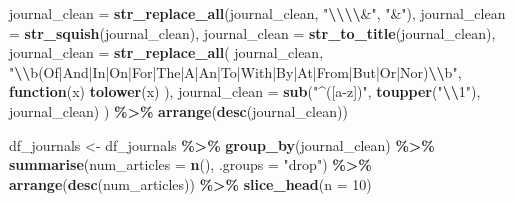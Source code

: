 \documentclass[
]{article}
\newenvironment{Shaded}{\begin{snugshade}}{\end{snugshade}}
\newcommand{\AttributeTok}[1]{\textcolor[rgb]{0.13,0.29,0.53}{#1}}
\newcommand{\ControlFlowTok}[1]{\textcolor[rgb]{0.13,0.29,0.53}{\textbf{#1}}}
\newcommand{\DecValTok}[1]{\textcolor[rgb]{0.00,0.00,0.81}{#1}}
\newcommand{\FunctionTok}[1]{\textcolor[rgb]{0.13,0.29,0.53}{\textbf{#1}}}
\newcommand{\NormalTok}[1]{#1}
\newcommand{\OtherTok}[1]{\textcolor[rgb]{0.56,0.35,0.01}{#1}}
\newcommand{\SpecialCharTok}[1]{\textcolor[rgb]{0.81,0.36,0.00}{\textbf{#1}}}
\newcommand{\StringTok}[1]{\textcolor[rgb]{0.31,0.60,0.02}{#1}}
\begin{document}
\begin{Shaded}
\begin{Highlighting}[]
    \AttributeTok{journal\_clean =} \FunctionTok{str\_replace\_all}\NormalTok{(journal\_clean, }\StringTok{"}\SpecialCharTok{\textbackslash{}\textbackslash{}\textbackslash{}\textbackslash{}}\StringTok{\&"}\NormalTok{, }\StringTok{"\&"}\NormalTok{),}
    \AttributeTok{journal\_clean =} \FunctionTok{str\_squish}\NormalTok{(journal\_clean),}
    \AttributeTok{journal\_clean =} \FunctionTok{str\_to\_title}\NormalTok{(journal\_clean),}
    \AttributeTok{journal\_clean =} \FunctionTok{str\_replace\_all}\NormalTok{(}
\NormalTok{      journal\_clean,}
      \StringTok{"}\SpecialCharTok{\textbackslash{}\textbackslash{}}\StringTok{b(Of|And|In|On|For|The|A|An|To|With|By|At|From|But|Or|Nor)}\SpecialCharTok{\textbackslash{}\textbackslash{}}\StringTok{b"}\NormalTok{,}
      \ControlFlowTok{function}\NormalTok{(x) }\FunctionTok{tolower}\NormalTok{(x)}
\NormalTok{    ),}
    \AttributeTok{journal\_clean =} \FunctionTok{sub}\NormalTok{(}\StringTok{"\^{}([a{-}z])"}\NormalTok{, }\FunctionTok{toupper}\NormalTok{(}\StringTok{"}\SpecialCharTok{\textbackslash{}\textbackslash{}}\StringTok{1"}\NormalTok{), journal\_clean)}
\NormalTok{  ) }\SpecialCharTok{\%\textgreater{}\%}
  \FunctionTok{arrange}\NormalTok{(}\FunctionTok{desc}\NormalTok{(journal\_clean))}

\NormalTok{df\_journals }\OtherTok{\textless{}{-}}\NormalTok{ df\_journals }\SpecialCharTok{\%\textgreater{}\%}
  \FunctionTok{group\_by}\NormalTok{(journal\_clean) }\SpecialCharTok{\%\textgreater{}\%}
  \FunctionTok{summarise}\NormalTok{(}\AttributeTok{num\_articles =} \FunctionTok{n}\NormalTok{(), }\AttributeTok{.groups =} \StringTok{"drop"}\NormalTok{) }\SpecialCharTok{\%\textgreater{}\%}
  \FunctionTok{arrange}\NormalTok{(}\FunctionTok{desc}\NormalTok{(num\_articles)) }\SpecialCharTok{\%\textgreater{}\%}
  \FunctionTok{slice\_head}\NormalTok{(}\AttributeTok{n =} \DecValTok{10}\NormalTok{)}
\end{Highlighting}
\end{Shaded}
\end{document}

